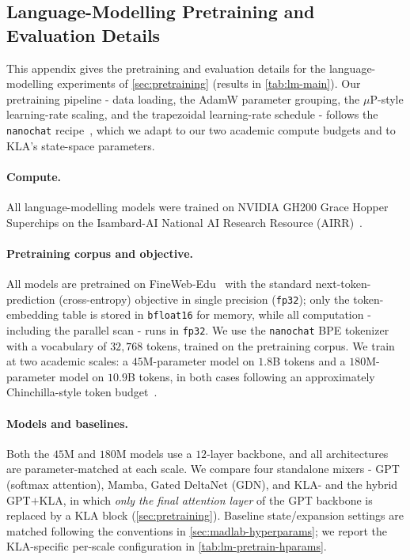 \documentclass{article}
\newcommand{\our}{\textsc{KLA}\xspace}
\begin{document}
\subsection{Language-Modelling Pretraining and Evaluation Details}
\label{app:lm-details}

This appendix gives the pretraining and evaluation details for the
language-modelling experiments of \cref{sec:pretraining} (results in
\cref{tab:lm-main}). Our pretraining pipeline - data loading, the AdamW
parameter grouping, the $\mu$P-style learning-rate scaling, and the trapezoidal
learning-rate schedule - follows the \texttt{nanochat} recipe~\citep{nanochat},
which we adapt to our two academic compute budgets and to \our's state-space
parameters.

\paragraph{Compute.} All language-modelling models were trained on NVIDIA GH200
Grace Hopper Superchips on the Isambard-AI National AI Research Resource
(AIRR)~\citep{mcintosh2024isambard}.

\paragraph{Pretraining corpus and objective.} All models are pretrained on
FineWeb-Edu~\citep{penedo2024fineweb} with the standard next-token-prediction
(cross-entropy) objective in single precision (\texttt{fp32}); only the
token-embedding table is stored in \texttt{bfloat16} for memory, while all
computation - including the parallel scan - runs in \texttt{fp32}. We use the \texttt{nanochat} BPE
tokenizer~\citep{nanochat} with a vocabulary of $32{,}768$ tokens, trained on the
pretraining corpus. We train at two academic scales: a $45$M-parameter model on
$1.8$B tokens and a $180$M-parameter model on $10.9$B tokens, in both cases
following an approximately Chinchilla-style token budget~\citep{hoffmann2022training}.

\paragraph{Models and baselines.} Both the $45$M and $180$M models use a
$12$-layer backbone, and all architectures are parameter-matched at each scale.
We compare four standalone mixers - GPT (softmax attention), Mamba, Gated
DeltaNet (GDN), and \our - and the hybrid GPT$+$\our, in which \emph{only the
final attention layer} of the GPT backbone is replaced by a \our block
(\cref{sec:pretraining}). Baseline state/expansion settings are matched following
the conventions in \cref{sec:madlab-hyperparams}; we report the \our-specific
per-scale configuration in \cref{tab:lm-pretrain-hparams}.
\end{document}
